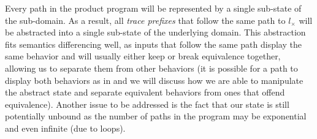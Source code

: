 
Every path in the product program will be represented by a single sub-state of the sub-domain. As a result, all \emph{trace prefixes} that follow the same path to $l_{\times}$ will be abstracted into a single sub-state of the underlying domain. This abstraction fits semantics differencing well, as inputs that follow the same path display the same behavior and will usually either keep or break equivalence together, allowing us to separate them from other behaviors (it is possible for a path to display both behaviors as in  and we will discuss how we are able to manipulate the abstract state and separate equivalent behaviors from ones that offend equivalence). Another issue to be addressed is the fact that our state is still potentially unbound as the number of paths in the program may be exponential and even infinite (due to loops).

